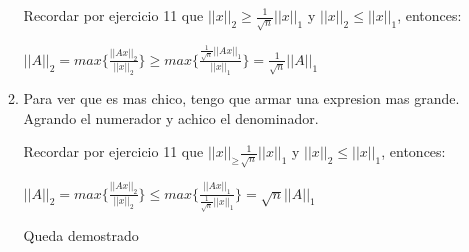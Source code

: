 \begin{enumerate}[label=(\alph*)]
\begin{enumerate}[label=(\roman*)]
            Recordar por ejercicio 11 que $||x||_2 \geq \frac{1}{\sqrt{n}} ||x||_1$ y $||x||_2 \leq  ||x||_1$, entonces:
    
            $||A||_2 = max \{\frac{||Ax||_2}{||x||_2} \} \geq  max \{\frac{\frac{1}{\sqrt{n}} ||Ax||_1}{||x||_1} \} =
            \frac{1}{\sqrt{n}} ||A||_1$
            \item
            Para ver que es mas chico, tengo que armar una expresion mas grande. Agrando el numerador y achico el denominador.
    
            Recordar por ejercicio 11 que $||x||_ \geq \frac{1}{\sqrt{n}} ||x||_1$ y $||x||_2 \leq  ||x||_1$, entonces:
    
            $||A||_2 = max \{\frac{||Ax||_2}{||x||_2} \} \leq  max \{\frac{||Ax||_1}{\frac{1}{\sqrt{n}} ||x||_1} \} =
            \sqrt{n} ||A||_1$
    
            Queda demostrado
        \end{enumerate}
    
    \end{enumerate}
    
\begin{aportes}
    \item {}
\end{aportes}
      